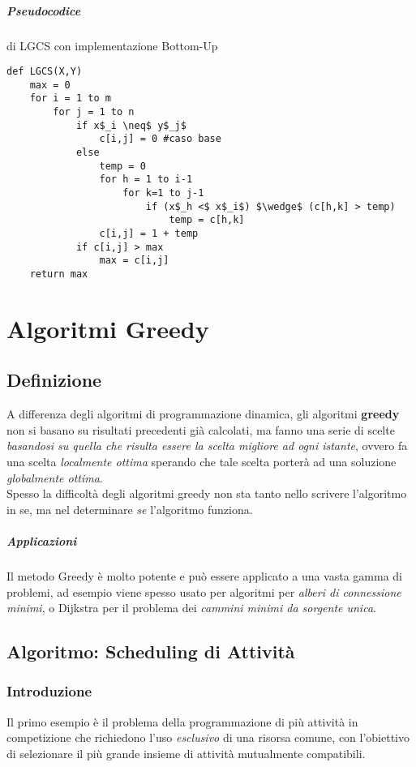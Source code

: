 \documentclass[12pt, a4paper, openany]{book}
\begin{document}
\paragraph*{Pseudocodice} di LGCS con implementazione Bottom-Up

\begin{lstlisting}
def LGCS(X,Y)
	max = 0
	for i = 1 to m
		for j = 1 to n
			if x$_i \neq$ y$_j$
				c[i,j] = 0 #caso base
			else
				temp = 0
				for h = 1 to i-1
					for k=1 to j-1
						if (x$_h <$ x$_i$) $\wedge$ (c[h,k] > temp)
							temp = c[h,k]
				c[i,j] = 1 + temp
			if c[i,j] > max
				max = c[i,j]
	return max
\end{lstlisting}

\chapter{Algoritmi Greedy}
\section{Definizione}
A differenza degli algoritmi di programmazione dinamica, gli algoritmi \textbf{greedy} non si basano su risultati precedenti già calcolati, ma fanno una serie di scelte \emph{basandosi su quella che risulta essere la scelta migliore ad ogni istante}, ovvero fa una scelta \emph{localmente ottima} sperando che tale scelta porterà ad una soluzione \emph{globalmente ottima}.
\\Spesso la difficoltà degli algoritmi greedy non sta tanto nello scrivere l'algoritmo in se, ma nel determinare \emph{se} l'algoritmo funziona.
\paragraph{Applicazioni}
Il metodo Greedy è molto potente e può essere applicato a una vasta gamma di problemi, ad esempio viene spesso usato per algoritmi per \emph{alberi di connessione minimi}, o Dijkstra per il problema dei \emph{cammini minimi da sorgente unica}.

\section{Algoritmo: Scheduling di Attività}

\subsection*{Introduzione}
Il primo esempio è il problema della programmazione di più attività in competizione che richiedono l'uso \emph{esclusivo} di una risorsa comune, con l'obiettivo di selezionare il più grande insieme di attività mutualmente compatibili.
\end{document}
